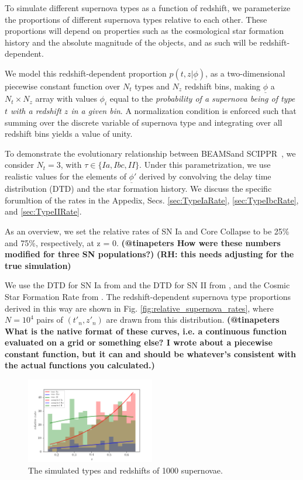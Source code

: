 \documentclass[12pt, twocolumn]{emulateapj}
\newcommand{\textul}{\underline}
\newcommand{\SCIPPR}{\textsc{SCIPPR}~}
\newcommand{\BEAMS}{\textsc{BEAMS}}
\begin{document}
\vspace{1cm}
To simulate different supernova types as a function of redshift, we parameterize the proportions of different supernova types relative to each other. 
These proportions will depend on properties such as the cosmological star formation history and the absolute magnitude of the objects, and as such will be redshift-dependent.

We model this redshift-dependent proportion $p(t, z | \textul{\phi})$, as a two-dimensional piecewise constant function over $N_t$ types and $N_z$ redshift bins, making $\textul{\phi}$ a $N_t\times N_z$ array with values $\phi_{i}$ equal to the \textit{probability of a supernova being of type $t$ with a redshift $z$ in a given bin}.  
A normalization condition is enforced such that summing over the discrete variable of supernova type and integrating over all redshift bins yields a value of unity.

To demonstrate the evolutionary relationship between \BEAMS and \SCIPPR, we consider $N_t=3$, with $\tau\in\{Ia, Ibc, II\}$. 
Under this parametrization, we use realistic values for the elements of $\textul{\phi}'$ derived by convolving the delay time distribution (DTD) and the star formation history.  
We discuss the specific forumltion of the rates in the Appedix, Secs. \ref{sec:TypeIaRate}, \ref{sec:TypeIbcRate}, and \ref{sec:TypeIIRate}. 

As an overview, we set the relative rates of SN Ia and Core Collapse to be 25\% and 75\%, respectively, at z = 0.  \textbf{(@tinapeters How were these numbers modified for three SN populations?)} 
\textbf{(RH: this needs adjusting for the true simulation)}

We use the DTD for SN Ia from \cite{graur/etal:2013} and the DTD for SN II from \cite{zapartas/etal:2017}, and the Cosmic Star Formation Rate from \cite{behroozi/etal:2013}. 
The redshift-dependent supernova type proportions derived in this way are shown in Fig. \ref{fig:relative_supernova_rates}, where $N=10^{4}$ pairs of $(t'_{n}, z'_{n})$ are drawn from this distribution.  \textbf{(@tinapeters What is the native format of these curves, i.e. a continuous function evaluated on a grid or something else?  I wrote about a piecewise constant function, but it can and should be whatever's consistent with the actual functions you calculated.)}  

\begin{figure}
	\begin{center}
		\includegraphics[width=0.5\textwidth]{fig/obs_rates.png}
		\caption{The simulated types and redshifts of 1000 supernovae.}
		\label{fig:obs_rates}
	\end{center}
\end{figure}
\end{document}
